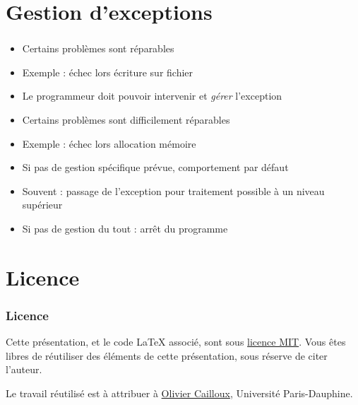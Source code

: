 \documentclass[english, french]{beamer}
\begin{document}
\section{Gestion d’exceptions}
\begin{frame}
	\frametitle{\secname}
	\begin{itemize}
		\item Certains problèmes sont réparables
		\item Exemple : échec lors écriture sur fichier
		\item Le programmeur doit pouvoir intervenir et \emph{gérer} l’exception
		\item Certains problèmes sont difficilement réparables
		\item Exemple : échec lors allocation mémoire
		\item Si pas de gestion spécifique prévue, comportement par défaut
		\item Souvent : passage de l’exception pour traitement possible à un niveau supérieur
		\item Si pas de gestion du tout : arrêt du programme
	\end{itemize}
\end{frame}

\appendix
\section{Licence}
\begin{frame}
	\frametitle{Licence}
	Cette présentation, et le code LaTeX associé, sont sous \href{http://opensource.org/licenses/MIT}{licence MIT}. Vous êtes libres de réutiliser des éléments de cette présentation, sous réserve de citer l’auteur.
	
	Le travail réutilisé est à attribuer à \href{http://www.lamsade.dauphine.fr/~ocailloux/}{Olivier Cailloux}, Université Paris-Dauphine.
\end{frame}
\end{document}
